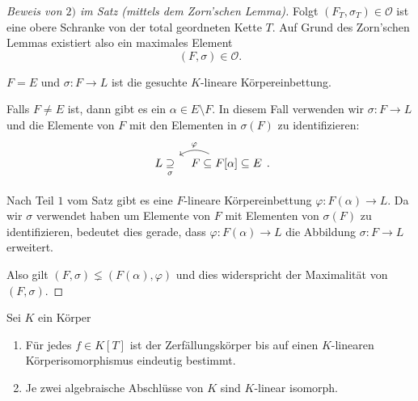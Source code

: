 \begin{proof}[Beweis von $2)$ im Satz (mittels dem Zorn'schen Lemma)]
	Folgt $(F_{T},\sigma_{T}) \in \mathcal{O}$ ist eine obere Schranke von der total geordneten Kette $T$.
	Auf Grund des Zorn'schen Lemmas existiert also ein maximales Element
	\[
		(F,\sigma) \in \mathcal{O}
	.\] 
	\begin{claim}
		$F = E$ und $\sigma : F  \to L$ ist die gesuchte $K$-lineare Körpereinbettung.
	\end{claim}
	Falls $F \neq E$ ist, dann gibt es ein $\alpha \in E \setminus F$. In diesem Fall verwenden wir $\sigma: F \to L$ und die Elemente von
	$F$ mit den Elementen in $\sigma(F)$ zu identifizieren:
	\[
		\begin{tikzcd}[column sep=tiny]
			L \underset{\sigma}{\supseteq} & F \subseteq F[\alpha] \subseteq E \arrow[l, "\varphi"', bend right] %
\end{tikzcd}
	.\] 

	Nach Teil $1$ vom Satz gibt es eine $F$-lineare Körpereinbettung $\varphi: F(\alpha) \to L$.
	Da wir $\sigma$ verwendet haben um Elemente von  $F$ mit Elementen von $\sigma(F)$ zu identifizieren,
	bedeutet dies gerade, dass $\varphi: F(\alpha) \to L$ die Abbildung $\sigma: F \to L$ erweitert.

	Also gilt $(F,\sigma) \lneq (F(\alpha),\varphi)$ und dies widerspricht der Maximalität von $(F,\sigma)$.
\end{proof}

\begin{corollary}
	Sei $K$ ein Körper
	\begin{enumerate}[1)]
		\item Für jedes $f \in K[T]$ ist der Zerfällungskörper bis auf einen $K$-linearen Körperisomorphismus eindeutig bestimmt.
		\item Je zwei algebraische Abschlüsse von $K$ sind $K$-linear isomorph.
	\end{enumerate}
\end{corollary}

